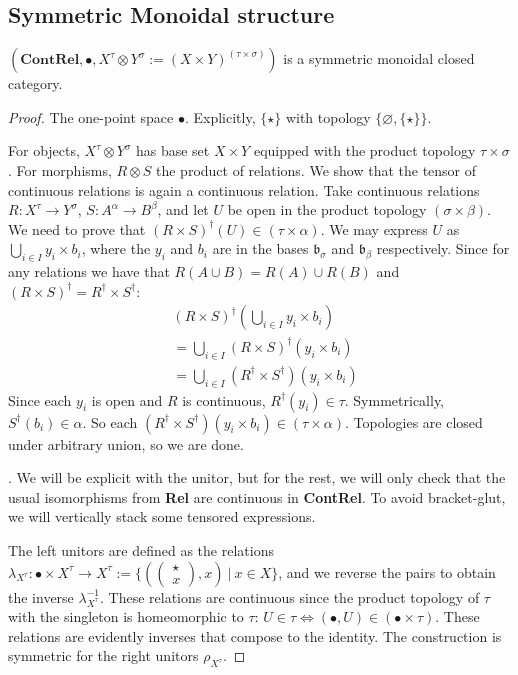 \begin{fullwidth}
\subsection{Symmetric Monoidal structure}

\begin{proposition}
$(\mathbf{ContRel},\bullet,X^\tau \otimes Y^\sigma := (X \times Y)^{(\tau \times \sigma)})$ is a symmetric monoidal closed category.
\begin{proof}

 The one-point space $\bullet$. Explicitly, $\{\star\}$ with topology $\{\varnothing,\{\star\}\}$.

 For objects, $X^\tau \otimes Y^\sigma$ has base set $X \times Y$ equipped with the product topology $\tau \times \sigma$. For morphisms, $R \otimes S$ the product of relations. We show that the tensor of continuous relations is again a continuous relation. Take continuous relations $R: X^\tau \rightarrow Y^\sigma$, $S: A^\alpha \rightarrow B^\beta$, and let $U$ be open in the product topology $(\sigma \times \beta)$. We need to prove that $(R \times S)^\dag(U) \in (\tau \times \alpha)$. We may express $U$ as $\bigcup\limits_{i \in I} y_i \times b_i$, where the $y_i$ and $b_i$ are in the bases $\mathfrak{b}_\sigma$ and $\mathfrak{b}_\beta$ respectively. Since for any relations we have that $R(A \cup B) = R(A) \cup R(B)$ and $(R \times S)^\dag = R^\dag \times S^\dag$:
\begin{align*}
&(R \times S)^\dag(\bigcup\limits_{i \in I} y_i \times b_i)\\
 &= \bigcup\limits_{i \in I}(R \times S)^\dag(y_i \times b_i)\\
 &= \bigcup\limits_{i \in I}(R^\dag \times S^\dag)(y_i \times b_i)
 \end{align*}
Since each $y_i$ is open and $R$ is continuous, $R^\dag(y_i) \in \tau$. Symmetrically, $S^\dag(b_i) \in \alpha$. So each $(R^\dag \times S^\dag)(y_i \times b_i) \in (\tau \times \alpha)$. Topologies are closed under arbitrary union, so we are done.

. We will be explicit with the unitor, but for the rest, we will only check that the usual isomorphisms from \textbf{Rel} are continuous in \textbf{ContRel}. To avoid bracket-glut, we will vertically stack some tensored expressions.

 The left unitors are defined as the relations $\lambda_{X^{\tau}}: \bullet \times X^\tau \rightarrow X^\tau := \{(\begin{pmatrix}\star \\x \end{pmatrix}, x) \ | \ x \in X\}$, and we reverse the pairs to obtain the inverse $\lambda^{-1}_{X^{\tau}}$. These relations are continuous since the product topology of $\tau$ with the singleton is homeomorphic to $\tau$: $U \in \tau \iff (\bullet,U) \in (\bullet \times \tau)$. These relations are evidently inverses that compose to the identity. The construction is symmetric for the right unitors $\rho_{X^{\tau}}$.


\end{proof}
\end{proposition}
\end{fullwidth}
